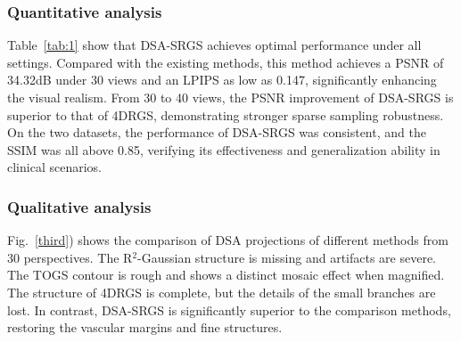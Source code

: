 \documentclass[runningheads]{llncs}
\begin{document}
\subsubsection{Quantitative analysis}Table~\ref{tab:1} show that DSA-SRGS achieves optimal performance under all settings. Compared with the existing methods, this method achieves a PSNR of 34.32dB under 30 views and an LPIPS as low as 0.147, significantly enhancing the visual realism. From 30 to 40 views, the PSNR improvement of DSA-SRGS is superior to that of 4DRGS, demonstrating stronger sparse sampling robustness. On the two datasets, the performance of DSA-SRGS was consistent, and the SSIM was all above 0.85, verifying its effectiveness and generalization ability in clinical scenarios.



\subsubsection{Qualitative analysis}Fig.~\ref{third}) shows the comparison of DSA projections of different methods from 30 perspectives. The R$^2$-Gaussian structure is missing and artifacts are severe. The TOGS contour is rough and shows a distinct mosaic effect when magnified. The structure of 4DRGS is complete, but the details of the small branches are lost. In contrast, DSA-SRGS is significantly superior to the comparison methods, restoring the vascular margins and fine structures.
\end{document}

